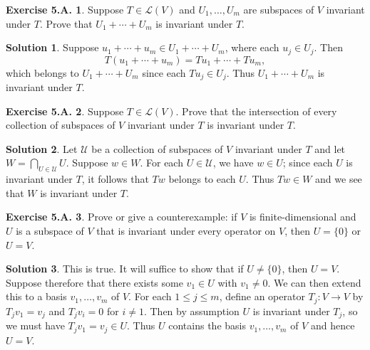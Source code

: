 \documentclass[12pt]{article}
\theoremstyle{definition}
\theoremstyle{exercise}
\newtheorem{exercise}{Exercise 5.A.}
\theoremstyle{solution}
\newtheorem*{solution}{Solution}
\newcommand{\lmap}{\mathcal{L}}
\begin{document}
\begin{exercise}
\label{ex:4}
    Suppose \( T \in \lmap(V) \) and \( U_1, \ldots, U_m \) are subspaces of \( V \) invariant under \( T \). Prove that \( U_1 + \cdots + U_m \) is invariant under \( T \).
\end{exercise}

\begin{solution}
    Suppose \( u_1 + \cdots + u_m \in U_1 + \cdots + U_m \), where each \( u_j \in U_j \). Then
    \[
        T(u_1 + \cdots + u_m) = Tu_1 + \cdots + Tu_m,
    \]
    which belongs to \( U_1 + \cdots + U_m \) since each \( Tu_j \in U_j \). Thus \( U_1 + \cdots + U_m \) is invariant under \( T \).
\end{solution}

\begin{exercise}
\label{ex:5}
    Suppose \( T \in \lmap(V) \). Prove that the intersection of every collection of subspaces of \( V \) invariant under \( T \) is invariant under \( T \).
\end{exercise}

\begin{solution}
    Let \( \mathscr{U} \) be a collection of subspaces of \( V \) invariant under \( T \) and let \( W = \bigcap_{U \in \mathscr{U}} U \). Suppose \( w \in W \). For each \( U \in \mathscr{U} \), we have \( w \in U \); since each \( U \) is invariant under \( T \), it follows that \( Tw \) belongs to each \( U \). Thus \( Tw \in W \) and we see that \( W \) is invariant under \( T \).
\end{solution}

\begin{exercise}
\label{ex:6}
    Prove or give a counterexample: if \( V \) is finite-dimensional and \( U \) is a subspace of \( V \) that is invariant under every operator on \( V \), then \( U = \{ 0 \} \) or \( U = V \).
\end{exercise}

\begin{solution}
    This is true. It will suffice to show that if \( U \neq \{ 0 \} \), then \( U = V \). Suppose therefore that there exists some \( v_1 \in U \) with \( v_1 \neq 0 \). We can then extend this to a basis \( v_1, \ldots, v_m \) of \( V \). For each \( 1 \leq j \leq m \), define an operator \( T_j : V \to V \) by \( T_j v_1 = v_j \) and \( T_j v_i = 0 \) for \( i \neq 1 \). Then by assumption \( U \) is invariant under \( T_j \), so we must have \( T_j v_1 = v_j \in U \). Thus \( U \) contains the basis \( v_1, \ldots, v_m \) of \( V \) and hence \( U = V \).
\end{solution}
\end{document}
